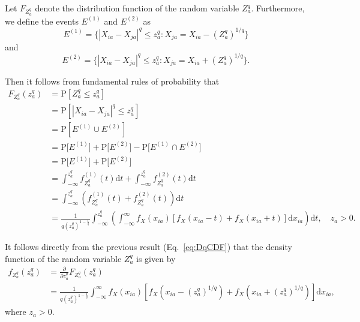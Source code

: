 \documentclass[10pt,letterpaper]{article}
\begin{document}
Let $F_{Z^q_a}$ denote the distribution function of the random variable $Z^q_a$. Furthermore, we define the events $E^{(1)}$ and $E^{(2)}$ as
%
\begin{equation}\label{eq:E(1)}
E^{(1)} = \bigl\{|X_{ia}-X_{ja}|^q \leq z^q_a : X_{ja} = X_{ia} - \left(Z^q_a\right)^{1/q}\bigr\}
\end{equation}
%
and
%
\begin{equation}\label{eq:E(2)}
E^{(2)} = \bigl\{|X_{ia}-X_{ja}|^q \leq z^q_a : X_{ja} = X_{ia} + \left(Z^q_a\right)^{1/q}\bigr\}.
\end{equation}

Then it follows from fundamental rules of probability that
%
\begin{equation}\label{eq:DqCDF}
\begin{aligned}
F_{Z^q_a}(z^q_a) &= \text{P}\left[Z^q_a \leq z^q_a\right] \\
&= \text{P}\left[|X_{ia} - X_{ja}|^q \leq z^q_a\right] \\
&= \text{P}\left[E^{(1)} \cup E^{(2)}\right] \\
&= \text{P}\bigl[E^{(1)}\bigr] + \text{P}\bigl[E^{(2)}\bigr] - \text{P}\bigl[E^{(1)} \cap E^{(2)}\bigr] \\
&= \text{P}\bigl[E^{(1)}\bigr] + \text{P}\bigl[E^{(2)}\bigr] \\
&= \int_{-\infty}^{z^q_a} f^{(1)}_{Z^q_a}(t) \text{d}t + \int_{-\infty}^{z^q_a} f^{(2)}_{Z^q_a}(t) \text{d}t \\
&= \int_{-\infty}^{z^q_a} \left(f^{(1)}_{Z^q_a}(t) + f^{(2)}_{Z^q_a}(t)\right) \text{d}t \\
&= \frac{1}{q \left(z^q_a\right)^{1 - \frac{1}{q}}}\int_{-\infty}^{z^q_a} \left(\int_{-\infty}^{\infty}f_X(x_{ia})\left[f_X(x_{ia} - t) + f_X(x_{ia} + t)\right] \text{d}x_{ia}\right)\text{d}t, \quad z_a > 0.
\end{aligned}
\end{equation}

It follows directly from the previous result (Eq.~\ref{eq:DqCDF}) that the density function of the random variable $Z^q_a$ is given by
%
\begin{equation}\label{eq:DqPDF}
\begin{aligned}
f_{Z^q_a}(z^q_a) &= \frac{\partial}{\partial z^q_a} F_{Z^q_a}(z^q_a) \\
&= \frac{1}{q \left(z^q_a\right)^{1 - \frac{1}{q}}}\int_{-\infty}^{\infty} f_X(x_{ia})\left[f_X\left(x_{ia} - \left(z^q_a\right)^{1/q}\right) + f_X\left(x_{ia} + \left(z^q_a\right)^{1/q}\right)\right] \text{d}x_{ia},
\end{aligned}
\end{equation}
%
where $z_a > 0$.
\end{document}
